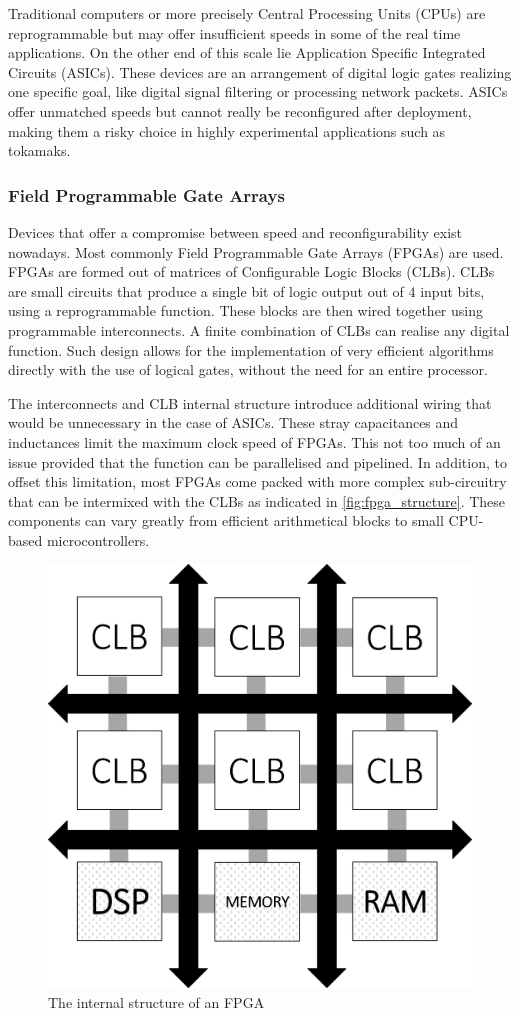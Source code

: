	Traditional computers or more precisely Central Processing Units (CPUs) 
	are reprogrammable but may offer insufficient speeds in 
	some of the real time applications. On the other end of this scale lie 
	Application Specific Integrated Circuits (ASICs). These devices are an 
	arrangement of digital logic gates realizing one specific goal, like 
	digital signal filtering or processing network packets.
	ASICs offer unmatched speeds but cannot really be reconfigured
	after deployment, making them a risky choice in highly experimental
	applications such as tokamaks.

  \subsubsection{Field Programmable Gate Arrays}
    Devices that offer a compromise between speed and reconfigurability
    exist nowadays. Most commonly Field Programmable Gate Arrays (FPGAs) are used.
    FPGAs are formed out of matrices of Configurable Logic Blocks (CLBs).
    CLBs are small circuits that produce a single bit of logic output
    out of 4 input bits, using a reprogrammable function. These blocks 
    are then wired together using programmable interconnects.
	A finite combination of CLBs can realise any digital function.
	Such design allows for the implementation of very efficient algorithms
    directly with the use of logical gates, without the need for an
    entire processor. \cite{xilinx_what_is_fpga}


    The interconnects and CLB internal structure introduce additional wiring
    that would be unnecessary in the case of ASICs. These stray capacitances 
    and inductances limit the maximum clock speed of FPGAs. This not too much
    of an issue provided that the function can be parallelised and pipelined.
	In addition, to offset this limitation, most FPGAs come packed with 
    more complex sub-circuitry that can be intermixed with the CLBs
    as indicated in \autoref{fig:fpga_structure}.
    These components can vary greatly from efficient arithmetical blocks
    to small CPU-based microcontrollers.

    \begin{figure}[H]
      \centering
      \includegraphics[width=.6\linewidth]{media/fpga_structure.png}
      \caption{The internal structure of an FPGA}
      \label{fig:fpga_structure}
    \end{figure}
    

